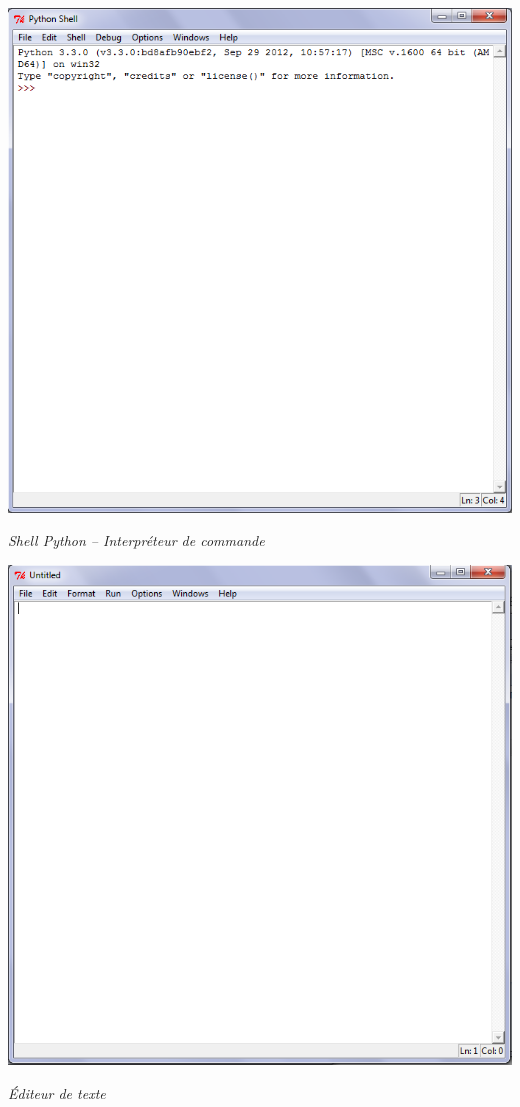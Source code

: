 \documentclass[11pt,oneside]{article}
\begin{document}
\begin{minipage}[c]{.45\linewidth}
\begin{center}
\includegraphics[width=.9\textwidth]{png/shell}

\textit{Shell Python -- Interpréteur de commande}
\end{center}
\end{minipage} \hfill
\begin{minipage}[c]{.45\linewidth}
\begin{center}
\includegraphics[width=.9\textwidth]{png/editeur}

\textit{Éditeur de texte}
\end{center}
\end{minipage}
\end{document}
